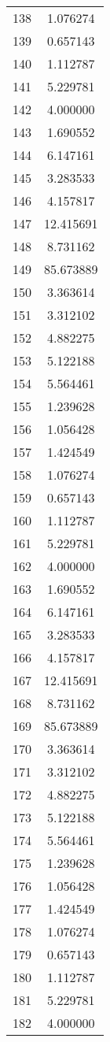 \documentclass[12pt]{article}
\begin{document}
\begin{longtable}{@{}cc@{}}
138 & 1.076274 \\
139 & 0.657143 \\
140 & 1.112787 \\
141 & 5.229781 \\
142 & 4.000000 \\
143 & 1.690552 \\
144 & 6.147161 \\
145 & 3.283533 \\
146 & 4.157817 \\
147 & 12.415691 \\
148 & 8.731162 \\
149 & 85.673889 \\
150 & 3.363614 \\
151 & 3.312102 \\
152 & 4.882275 \\
153 & 5.122188 \\
154 & 5.564461 \\
155 & 1.239628 \\
156 & 1.056428 \\
157 & 1.424549 \\
158 & 1.076274 \\
159 & 0.657143 \\
160 & 1.112787 \\
161 & 5.229781 \\
162 & 4.000000 \\
163 & 1.690552 \\
164 & 6.147161 \\
165 & 3.283533 \\
166 & 4.157817 \\
167 & 12.415691 \\
168 & 8.731162 \\
169 & 85.673889 \\
170 & 3.363614 \\
171 & 3.312102 \\
172 & 4.882275 \\
173 & 5.122188 \\
174 & 5.564461 \\
175 & 1.239628 \\
176 & 1.056428 \\
177 & 1.424549 \\
178 & 1.076274 \\
179 & 0.657143 \\
180 & 1.112787 \\
181 & 5.229781 \\
182 & 4.000000 \\

\end{longtable}
\end{document}
